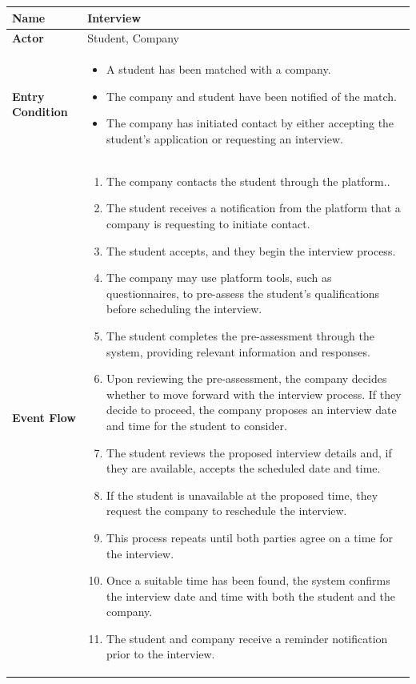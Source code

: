 \begin{longtable}{|p{}|p{}|}
\hline
\textbf{Name} &  Interview\\
\hline
\textbf{Actor} &  Student, Company\\
\hline
\textbf{Entry Condition} &  
\begin{itemize}
    \item A student has been matched with a company.
    \item The company and student have been notified of the match.
    \item The company has initiated contact by either accepting the student's application or requesting an interview.
\end{itemize} 
\\
\hline
\textbf{Event Flow} &  
\begin{enumerate}
    \item The company contacts the student through the platform..
    \item The student receives a notification from the platform that a company is requesting to initiate contact.
    \item The student accepts, and they begin the interview process.
    \item The company may use platform tools, such as questionnaires, to pre-assess the student's qualifications before scheduling the interview.
    \item The student completes the pre-assessment through the system, providing relevant information and responses.
    \item Upon reviewing the pre-assessment, the company decides whether to move forward with the interview process. If they decide to proceed, the company proposes an interview date and time for the student to consider.
    \item The student reviews the proposed interview details and, if they are available, accepts the scheduled date and time.
    \item If the student is unavailable at the proposed time, they request the company to reschedule the interview.
    \item This process repeats until both parties agree on a time for the interview.
    \item Once a suitable time has been found, the system confirms the interview date and time with both the student and the company.
    \item The student and company receive a reminder notification prior to the interview.

\end{enumerate}
\end{longtable}
